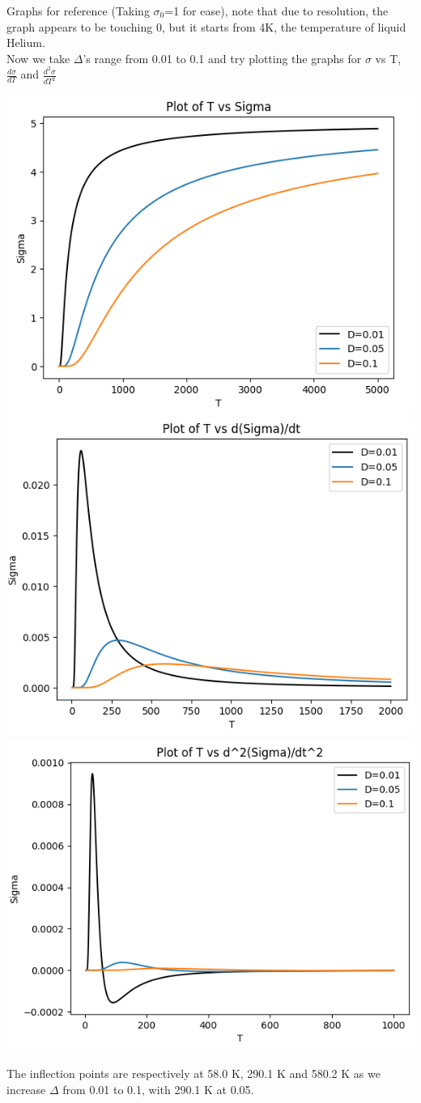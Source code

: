 \documentclass[12pt,a4paper]{article}
\begin{document}
	  Graphs for reference (Taking $\sigma_0$=1 for ease), note that due to resolution, the graph appears to be touching 0, but it starts from 4K, the temperature of liquid Helium.\\
\newpage 
Now we take $\Delta$'s range from 0.01 to 0.1 and try plotting the graphs for $\sigma$ vs T, $\frac{d\sigma}{dT}$ and $\frac{d^2\sigma}{dT^2}$
\begin{center}
	\includegraphics[width=10 cm]{sigma3.png}\\
		\includegraphics[width=10 cm]{sigma4.png}\\
			\includegraphics[width=10 cm]{sigma5.png}
\end{center}
The inflection points are respectively at 58.0 K, 290.1 K and 580.2 K as we increase $\Delta$ from 0.01 to 0.1, with 290.1 K at 0.05.
\end{document}
